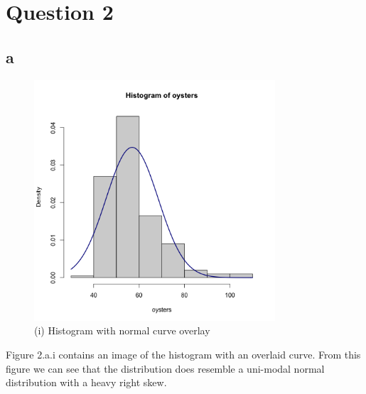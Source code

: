 \documentclass[a4paper, 12pt]{article}
\begin{document}
    \pagebreak
    \section{Question 2}
    
    \subsection{a}
        \renewcommand{\figurename}{Figure 2.a}
        \begin{figure}[h]
            \centering
            \includegraphics[width=0.8\textwidth]{2.a.i.png}
            \caption{(i) Histogram with normal curve overlay}
            \label{fig:mesh1}
        \end{figure}
        Figure 2.a.i contains an image of the histogram with an overlaid curve. From this figure we can see that the distribution does resemble a uni-modal normal distribution with a heavy right skew. 
\end{document}
